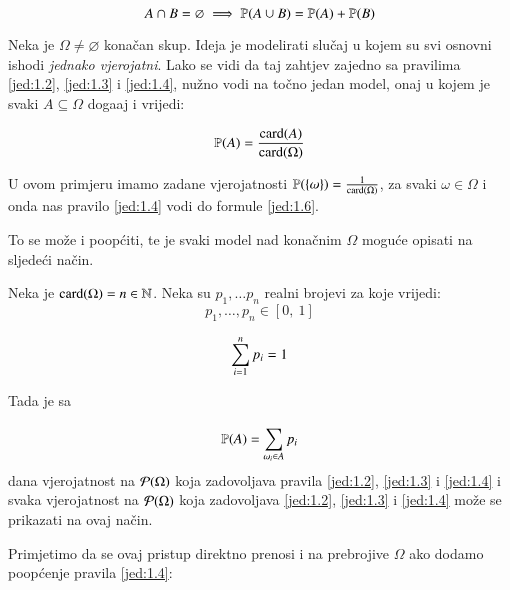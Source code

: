 \begin{equation} \label{jed:1.4}
    A \cap B = \varnothing \implies \mathbb{P}({A \cup B}) = \mathbb{P}({A}) + \mathbb{P}({B})
\end{equation}

\begin{pr} \label{pr:1.5}
    Neka je $\Omega \neq \varnothing$ kona\v can skup.
    Ideja je modelirati slu\v caj u kojem su svi osnovni ishodi \emph{jednako vjerojatni}.
    Lako se vidi da taj zahtjev zajedno sa pravilima \eqref{jed:1.2}, \eqref{jed:1.3} i \eqref{jed:1.4}, nu\v zno vodi na to\v cno jedan model, onaj u kojem je svaki $A \subseteq \Omega$ doga\dj aj i vrijedi:

    \begin{equation} \label{jed:1.6}
        \mathbb{P}({A}) = \frac{\mathrm{card}({A})}{\mathrm{card}({\Omega})}
    \end{equation}
\end{pr}

U ovom primjeru imamo zadane vjerojatnosti $\mathbb{P}({\{ \omega\}}) = \frac{1}{\mathrm{card}({\Omega})}$, za svaki $\omega \in \Omega$ i onda nas pravilo \eqref{jed:1.4} vodi do formule \eqref{jed:1.6}.

To se mo\v ze i poop\' citi, te je svaki model nad kona\v cnim $\Omega$ mogu\' ce opisati na sljede\' ci na\v cin.

\begin{pr} \label{pr:1.7}
    Neka je $\mathrm{card}({\Omega}) = n \in \mathbb{N}$.
    Neka su $p_1, \dots p_n$ realni brojevi za koje vrijedi:
    \begin{equation}    \label{jed:1.8}
        p_1, \dots, p_n \in [0, \: 1]
    \end{equation}

    \begin{equation}    \label{jed:1.9}
        \sum\limits_{i = 1}^{n} p_i = 1
    \end{equation}

    Tada je sa

    \begin{equation} \label{jed:1.10}
        \mathbb{P}({A}) = \sum\limits_{\omega_i \in A}^{} p_i
    \end{equation}
    dana vjerojatnost na $\mathcal{P}({\Omega})$ koja zadovoljava pravila \eqref{jed:1.2}, \eqref{jed:1.3} i \eqref{jed:1.4} i svaka vjerojatnost na $\mathcal{P}({\Omega})$ koja zadovoljava \eqref{jed:1.2}, \eqref{jed:1.3} i \eqref{jed:1.4} mo\v ze se prikazati na ovaj na\v cin.
\end{pr}

Primjetimo da se ovaj pristup direktno prenosi i na prebrojive $\Omega$ ako dodamo poop\' cenje pravila \eqref{jed:1.4}:

